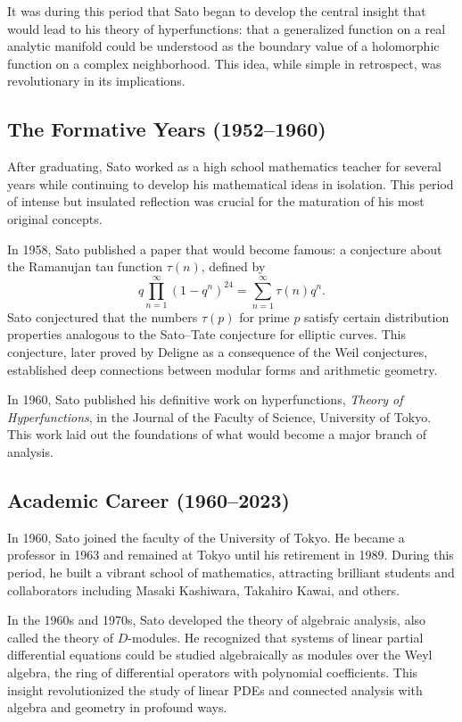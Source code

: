 It was during this period that Sato began to develop the central insight that would lead to his theory of hyperfunctions: that a generalized function on a real analytic manifold could be understood as the boundary value of a holomorphic function on a complex neighborhood. This idea, while simple in retrospect, was revolutionary in its implications.

\subsection{The Formative Years (1952--1960)}

After graduating, Sato worked as a high school mathematics teacher for several years while continuing to develop his mathematical ideas in isolation. This period of intense but insulated reflection was crucial for the maturation of his most original concepts.

In 1958, Sato published a paper that would become famous: a conjecture about the Ramanujan tau function \(\tau(n)\), defined by
\[
q\prod_{n=1}^\infty (1-q^n)^{24} = \sum_{n=1}^\infty \tau(n) q^n.
\]
Sato conjectured that the numbers \(\tau(p)\) for prime \(p\) satisfy certain distribution properties analogous to the Sato--Tate conjecture for elliptic curves. This conjecture, later proved by Deligne as a consequence of the Weil conjectures, established deep connections between modular forms and arithmetic geometry.

In 1960, Sato published his definitive work on hyperfunctions, \textit{Theory of Hyperfunctions}, in the Journal of the Faculty of Science, University of Tokyo. This work laid out the foundations of what would become a major branch of analysis.

\subsection{Academic Career (1960--2023)}

In 1960, Sato joined the faculty of the University of Tokyo. He became a professor in 1963 and remained at Tokyo until his retirement in 1989. During this period, he built a vibrant school of mathematics, attracting brilliant students and collaborators including Masaki Kashiwara, Takahiro Kawai, and others.

In the 1960s and 1970s, Sato developed the theory of algebraic analysis, also called the theory of \(D\)-modules. He recognized that systems of linear partial differential equations could be studied algebraically as modules over the Weyl algebra, the ring of differential operators with polynomial coefficients. This insight revolutionized the study of linear PDEs and connected analysis with algebra and geometry in profound ways.

